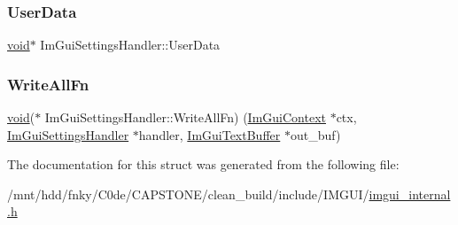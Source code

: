 \subsubsection{\texorpdfstring{User\+Data}{UserData}}
{\footnotesize\ttfamily \hyperlink{imgui__impl__opengl3__loader_8h_ac668e7cffd9e2e9cfee428b9b2f34fa7}{void}$\ast$ Im\+Gui\+Settings\+Handler\+::\+User\+Data}

\mbox{\label{structImGuiSettingsHandler_a8f9d8923be4df1b5e6c17f9857b955f4}} 
\subsubsection{\texorpdfstring{Write\+All\+Fn}{WriteAllFn}}
{\footnotesize\ttfamily \hyperlink{imgui__impl__opengl3__loader_8h_ac668e7cffd9e2e9cfee428b9b2f34fa7}{void}($\ast$ Im\+Gui\+Settings\+Handler\+::\+Write\+All\+Fn) (\hyperlink{structImGuiContext}{Im\+Gui\+Context} $\ast$ctx, \hyperlink{structImGuiSettingsHandler}{Im\+Gui\+Settings\+Handler} $\ast$handler, \hyperlink{structImGuiTextBuffer}{Im\+Gui\+Text\+Buffer} $\ast$out\+\_\+buf)}



The documentation for this struct was generated from the following file\+:\begin{DoxyCompactItemize}
\item 
/mnt/hdd/fnky/\+C0de/\+C\+A\+P\+S\+T\+O\+N\+E/clean\+\_\+build/include/\+I\+M\+G\+U\+I/\hyperlink{imgui__internal_8h}{imgui\+\_\+internal.\+h}\end{DoxyCompactItemize}
